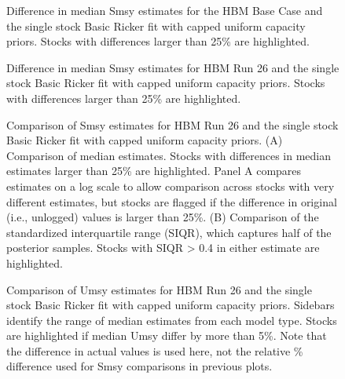 \documentclass[french,11pt]{book}
\begin{document}
\begin{figure}[htb]

{\centering {} 

}

\caption{Difference in median Smsy estimates for the HBM Base Case and the single stock Basic Ricker fit with capped uniform capacity priors. Stocks with differences larger than 25\% are highlighted.}\label{fig:HBMComp1}
\end{figure}

\begin{figure}[htb]

{\centering {} 

}

\caption{Difference in median Smsy estimates for HBM Run 26 and the single stock Basic Ricker fit with capped uniform capacity priors. Stocks with differences larger than 25\% are highlighted.}\label{fig:HBMComp2}
\end{figure}
\clearpage


\begin{figure}[htb]

{\centering {} 

}

\caption{Comparison of Smsy estimates for HBM Run 26 and the single stock Basic Ricker fit with capped uniform capacity priors. (A) Comparison of median estimates. Stocks with differences in median estimates larger than 25\% are highlighted. Panel A compares estimates on a log scale to allow comparison across stocks with very different estimates, but stocks are flagged if the difference in original (i.e., unlogged) values is larger than 25\%. (B) Comparison of the standardized interquartile range (SIQR), which captures half of the posterior samples. Stocks with SIQR \textgreater{} 0.4 in either estimate are highlighted.}\label{fig:HBMComp3}
\end{figure}

\begin{figure}[htb]

{\centering {} 

}

\caption{Comparison of Umsy estimates for HBM Run 26 and the single stock Basic Ricker fit with capped uniform capacity priors. Sidebars identify the range of median estimates from each model type. Stocks are highlighted if median Umsy differ by more than 5\%. Note that the difference in actual values is used here, not the relative \% difference used for Smsy comparisons in previous plots.}\label{fig:HBMComp4}
\end{figure}
\clearpage
\end{document}
